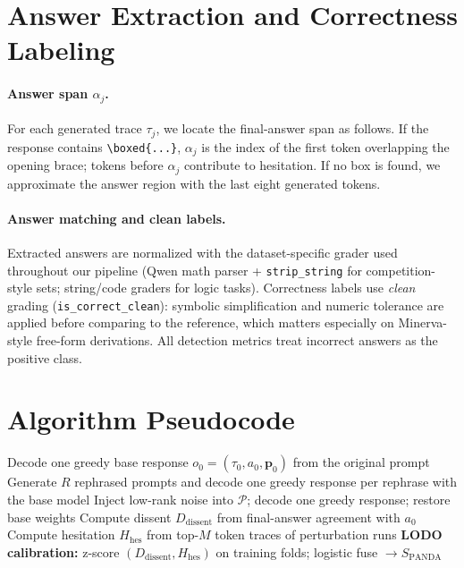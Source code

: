 \documentclass{article} %
\DeclareRobustCommand{\method}{%
  \texorpdfstring{%
    \ifmmode\text{\normalfont\textsc{panda}}\else\textsc{panda}\xspace\fi
  }{PANDA}%
}
\begin{document}
\section{Answer Extraction and Correctness Labeling}
\label{app:answer}

\paragraph{Answer span $\alpha_j$.}
For each generated trace $\tau_j$, we locate the final-answer span as follows.
If the response contains \verb|\boxed{...}|, $\alpha_j$ is the index of the first token overlapping the opening brace; tokens before $\alpha_j$ contribute to hesitation.
If no box is found, we approximate the answer region with the last eight generated tokens.

\paragraph{Answer matching and clean labels.}
Extracted answers are normalized with the dataset-specific grader used throughout our pipeline (Qwen math parser + \texttt{strip\_string} for competition-style sets; string/code graders for logic tasks).
Correctness labels use \emph{clean} grading (\texttt{is\_correct\_clean}): symbolic simplification and numeric tolerance are applied before comparing to the reference, which matters especially on Minerva-style free-form derivations.
All detection metrics treat incorrect answers as the positive class.


\section{Algorithm Pseudocode}
\label{app:algorithm}

\begin{algorithm}[t]
  \caption{\method{} inference and scoring (per question).}
  \label{alg:panda}
  \begin{algorithmic}[1]
    \State Decode one greedy base response $o_0=(\tau_0,a_0,\mathbf{p}_0)$ from the original prompt
    \State Generate $R$ rephrased prompts and decode one greedy response per rephrase with the base model
      \State Inject low-rank noise into $\mathcal{P}$; decode one greedy response; restore base weights
    \EndFor
    \State Compute dissent $D_{\mathrm{dissent}}$ from final-answer agreement with $a_0$
    \State Compute hesitation $H_{\mathrm{hes}}$ from top-$M$ token traces of perturbation runs
    \State \textbf{LODO calibration:} z-score $(D_{\mathrm{dissent}},H_{\mathrm{hes}})$ on training folds; logistic fuse $\rightarrow S_{\mathrm{PANDA}}$
  \end{algorithmic}
\end{algorithm}
\end{document}
